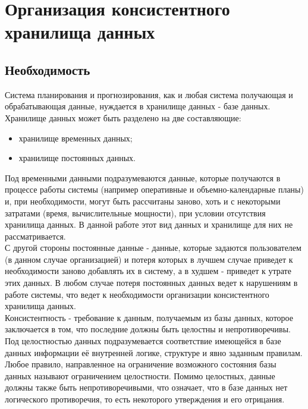 \chapter{Организация консистентного хранилища данных}
\section{Необходимость}
\indent Система планирования и прогнозирования, как и любая система получающая и обрабатывающая данные, нуждается в хранилище данных - базе данных.
Хранилище данных может быть разделено на две составляющие:
\begin{itemize}
	\item хранилище временных данных;
	\item хранилище постоянных данных.
\end{itemize}

\indent Под временными данными подразумеваются данные, которые получаются в процессе работы системы (например оперативные и объемно-календарные планы) и, при необходимости, могут быть рассчитаны заново, хоть и с некоторыми затратами (время, вычислительные мощности), при условии отсутствия хранилища данных.
В данной работе этот вид данных и хранилище для них не рассматривается.\\
\indent С другой стороны постоянные данные - данные, которые задаются пользователем (в данном случае организацией) и потеря которых в лучшем случае приведет к необходимости заново добавлять их в систему, а в худшем - приведет к утрате этих данных.
В любом случае потеря постоянных данных ведет к нарушениям в работе системы, что ведет к необходимости организации консистентного хранилища данных.\\
\indent Консистентность - требование к данным, получаемым из базы данных, которое заключается в том, что последние должны быть целостны и непротиворечивы.
Под целостностью данных подразумевается соответствие имеющейся в базе данных информации её внутренней логике, структуре и явно заданным правилам.
Любое правило, направленное на ограничение возможного состояния базы данных называют ограничением целостности.
Помимо целостных, данные должны также быть непротиворечивыми, что означает, что в базе данных нет логического противоречия, то есть некоторого утверждения и его отрицания.



